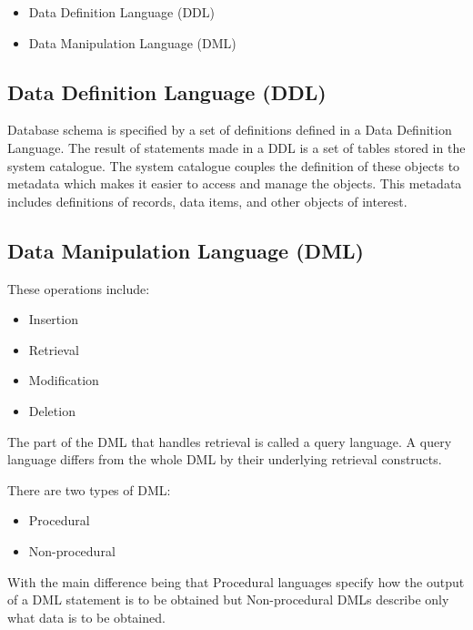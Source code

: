 \documentclass[12pt letter]{report}
\begin{document}

\begin{itemize}
  \item Data Definition Language (DDL)
  \item Data Manipulation Language (DML)
\end{itemize}


\subsection{Data Definition Language (DDL)}


Database schema is specified by a set of definitions defined in a Data Definition Language. The result of statements
made in a DDL is a set of tables stored in the system catalogue. The system catalogue couples the definition of these
objects to metadata which makes it easier to access and manage the objects. This metadata includes definitions of
records, data items, and other objects of interest.

\subsection{Data Manipulation Language (DML)}
These operations include:
\begin{itemize}
  \item Insertion
  \item Retrieval
  \item Modification
  \item Deletion
\end{itemize}

The part of the DML that handles retrieval is called a query language. A query language differs from the whole DML by
their underlying retrieval constructs.


There are two types of DML:
\begin{itemize}
  \item Procedural
  \item Non-procedural
\end{itemize}
With the main difference being that Procedural languages specify how the output of a DML statement is to be obtained but
Non-procedural DMLs describe only what data is to be obtained.
\end{document}
